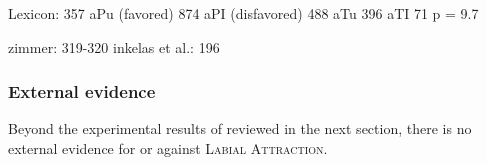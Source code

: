 Lexicon:
357 aPu (favored)
874 aPI (disfavored)
488 aTu
396 aTI
71%
p = 9.7

zimmer: 319-320 
inkelas et al.: 196

\subsubsection{External evidence}

Beyond the experimental results of \citet{Zimmer1969} reviewed in the next section, there is no external evidence for or against \textsc{Labial Attraction}.

